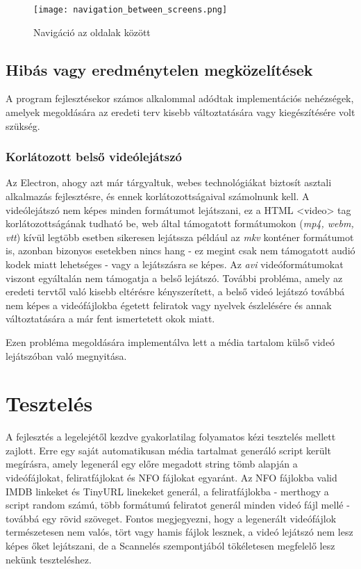 \begin{figure}[H]
	\centering
	\texttt{[image: navigation\_between\_screens.png]}
	\caption{Navigáció az oldalak között}
	\label{fig:navigation_between_screens}
\end{figure}

\subsection{Hibás vagy eredménytelen megközelítések}
A program fejlesztésekor számos alkalommal adódtak implementációs nehézségek, amelyek megoldására az eredeti terv kisebb változtatására vagy kiegészítésére volt szükség.

\subsubsection{Korlátozott belső videólejátszó}
Az Electron, ahogy azt már tárgyaltuk, webes technológiákat biztosít asztali alkalmazás fejlesztésre, és ennek korlátozottságaival számolnunk kell. A videólejátszó nem képes minden formátumot lejátszani, ez a HTML <video> tag korlátozottságának tudható be, web által támogatott formátumokon ({\it mp4, webm, vtt}) kívül legtöbb esetben sikeresen lejátssza például az {\it mkv} konténer formátumot is, azonban bizonyos esetekben nincs hang - ez megint csak nem támogatott audió kodek miatt lehetséges - vagy a lejátszásra se képes. Az {\it avi} videóformátumokat viszont egyáltalán nem támogatja a belső lejátszó.
További probléma, amely az eredeti tervtől való kisebb eltérésre kényszerített, a belső videó lejátszó továbbá nem képes a videófájlokba égetett feliratok vagy nyelvek észlelésére és annak változtatására a már fent ismertetett okok miatt.

Ezen probléma megoldására implementálva lett a média tartalom külső videó lejátszóban való megnyitása.

\section{Tesztelés}
A fejlesztés a legelejétől kezdve gyakorlatilag folyamatos kézi tesztelés mellett zajlott. Erre egy saját automatikusan média tartalmat generáló script került megírásra, amely legenerál egy előre megadott string tömb alapján a videófájlokat, feliratfájlokat és NFO fájlokat egyaránt. Az NFO fájlokba valid IMDB linkeket és TinyURL linekeket generál, a feliratfájlokba - merthogy a script random számú, több formátumú feliratot generál minden videó fájl mellé - továbbá egy rövid szöveget. Fontos megjegyezni, hogy a legenerált videófájlok természetesen nem valós, tört vagy hamis fájlok lesznek, a videó lejátszó nem lesz képes őket lejátszani, de a Scannelés szempontjából tökéletesen megfelelő lesz nekünk teszteléshez.

